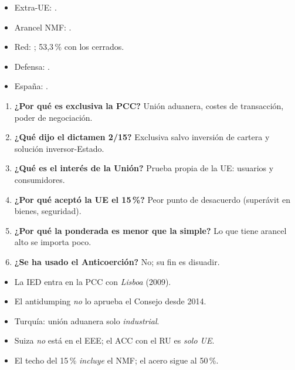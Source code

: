 \documentclass{article}
\begin{document}
\begin{columnas}
\anexorepaso
{}
\begin{itemize}
\item Extra-UE: .
\item Arancel NMF: .
\item Red: ; 53,3\,\% con los cerrados.
\item Defensa: .
\item España: .
\end{itemize}
\begin{enumerate}
\item \textbf{¿Por qué es exclusiva la PCC?} Unión aduanera, costes de transacción, poder de negociación.
\item \textbf{¿Qué dijo el dictamen 2/15?} Exclusiva salvo inversión de cartera y solución inversor-Estado.
\item \textbf{¿Qué es el interés de la Unión?} Prueba propia de la UE: usuarios y consumidores.
\item \textbf{¿Por qué aceptó la UE el 15\,\%?} Peor punto de desacuerdo (superávit en bienes, seguridad).
\item \textbf{¿Por qué la ponderada es menor que la simple?} Lo que tiene arancel alto se importa poco.
\item \textbf{¿Se ha usado el Anticoerción?} No; su fin es disuadir.
\end{enumerate}
\begin{trampa}
\begin{itemize}
\item La IED entra en la PCC con \emph{Lisboa} (2009).
\item El antidumping \emph{no} lo aprueba el Consejo desde 2014.
\item Turquía: unión aduanera solo \emph{industrial}.
\item Suiza \emph{no} está en el EEE; el ACC con el RU es \emph{solo UE}.
\item El techo del 15\,\% \emph{incluye} el NMF; el acero sigue al 50\,\%.
\end{itemize}
\end{trampa}

\end{columnas}
\end{document}
